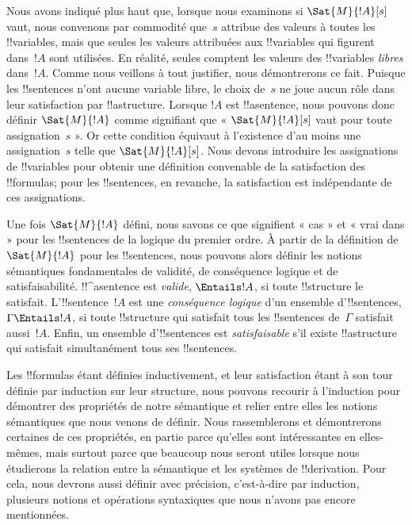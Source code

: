 \documentclass[11pt,a4paper,openany]{memoir}
\begin{document}
Nous avons indiqué plus haut que, lorsque nous examinons si
$\Sat{M}{!A}[s]$ vaut, nous convenons par commodité que~$s$ attribue
des valeurs à toutes les !!{variable}s, mais que seules les valeurs
attribuées aux !!{variable}s qui figurent dans~$!A$ sont utilisées. En
réalité, seules comptent les valeurs des !!{variable}s \emph{libres}
dans~$!A$. Comme nous veillons à tout justifier, nous démontrerons ce
fait. Puisque les !!{sentence}s n'ont aucune variable libre, le choix
de~$s$ ne joue aucun rôle dans leur satisfaction par
!!a{structure}. Lorsque $!A$ est !!a{sentence}, nous pouvons donc
définir $\Sat{M}{!A}$ comme signifiant que
« $\Sat{M}{!A}[s]$ vaut pour toute assignation~$s$ ». Or cette
condition équivaut à l'existence d'au moins une assignation~$s$ telle
que $\Sat{M}{!A}[s]$. Nous devons introduire les assignations de
!!{variable}s pour obtenir une définition convenable de la satisfaction
des !!{formula}s; pour les !!{sentence}s, en revanche, la satisfaction
est indépendante de ces assignations.

Une fois $\Sat{M}{!A}$ défini, nous savons ce que signifient « cas » et
« vrai dans » pour les !!{sentence}s de la logique du premier ordre.
À partir de la définition de $\Sat{M}{!A}$ pour les !!{sentence}s, nous
pouvons alors définir les notions sémantiques fondamentales de
validité, de conséquence logique et de satisfaisabilité.
!!^a{sentence} est \emph{valide}, $\Entails !A$, si toute
!!{structure} le satisfait. L'!!{sentence}~$!A$ est une
\emph{conséquence logique} d'un ensemble d'!!{sentence}s,
$\Gamma \Entails !A$, si toute !!{structure} qui satisfait tous les
!!{sentence}s de~$\Gamma$ satisfait aussi~$!A$. Enfin, un ensemble
d'!!{sentence}s est \emph{satisfaisable} s'il existe
!!a{structure} qui satisfait simultanément tous ses !!{sentence}s.

Les !!{formula}s étant définies inductivement, et leur satisfaction
étant à son tour définie par induction sur leur structure, nous pouvons
recourir à l'induction pour démontrer des propriétés de notre
sémantique et relier entre elles les notions sémantiques que nous
venons de définir. Nous rassemblerons et démontrerons certaines de ces
propriétés, en partie parce qu'elles sont intéressantes en elles-mêmes,
mais surtout parce que beaucoup nous seront utiles lorsque nous
étudierons la relation entre la sémantique et les systèmes de
!!{derivation}. Pour cela, nous devrons aussi définir avec précision,
c'est-à-dire par induction, plusieurs notions et opérations syntaxiques
que nous n'avons pas encore mentionnées.
\end{document}
